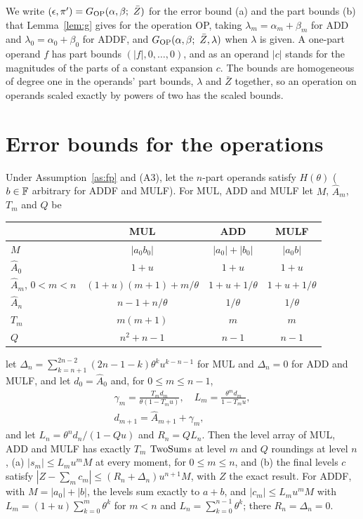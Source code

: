 We write $(\epsilon, \pi') = G_{\rm OP}(\alpha, \beta;\ \bar Z)$ for the error bound (a) and the part bounds (b) that
Lemma~\ref{lem:g} gives for the operation OP, taking $\lambda_m = \alpha_m + \beta_m$ for ADD and $\lambda_0 = \alpha_0
+ \beta_0$ for ADDF, and $G_{\rm OP}(\alpha, \beta;\ \bar Z, \lambda)$ when $\lambda$ is given. A one-part operand $f$
has part bounds $(|f|, 0, \dots, 0)$, and
as an operand $|c|$ stands for the magnitudes of the parts of a constant expansion $c$. The bounds are homogeneous of
degree one in the operands' part bounds, $\lambda$ and $\bar Z$ together, so an operation on operands scaled exactly by
powers of two has the scaled bounds.

\section{Error bounds for the operations}\label{sec:bounds}

\begin{theorem}\label{thm:t2}
Under Assumption~\ref{as:fp} and (A3), let the $n$-part operands
satisfy $H(\theta)$ ($b \in \mathbb{F}$ arbitrary for ADDF and MULF). For MUL, ADD and MULF let $M$, $\hat A_m$, $T_m$ and $Q$ be
\begin{center}
\setlength{\tabcolsep}{5pt}
{\footnotesize\setlength{\tabcolsep}{2.5pt}\begin{tabular}{lccc}
\toprule
& MUL & ADD & MULF \\
\midrule
$M$ & $|a_0 b_0|$ & $|a_0| + |b_0|$ & $|a_0 b|$ \\
$\hat A_0$ & $1+u$ & $1+u$ & $1+u$ \\
$\hat A_m$, $0 < m < n$ & $(1+u)(m+1) + m/\theta$ & $1 + u + 1/\theta$ & $1 + u + 1/\theta$ \\
$\hat A_n$ & $n-1 + n/\theta$ & $1/\theta$ & $1/\theta$ \\
$T_m$ & $m(m+1)$ & $m$ & $m$ \\
$Q$ & $n^2 + n - 1$ & $n-1$ & $n-1$ \\
\bottomrule
\end{tabular}}
\end{center}
let $\Delta_n = \sum_{k=n+1}^{2n-2}(2n-1-k)\theta^k u^{k-n-1}$ for MUL and $\Delta_n = 0$ for ADD and MULF,
and let $d_0 = \hat A_0$ and, for $0 \le m \le n-1$,
\begin{gather*}
\gamma_m = \frac{T_m d_m}{\theta(1 - T_m u)}, \quad L_m = \frac{\theta^m d_m}{1 - T_m u}, \\
d_{m+1} = \hat A_{m+1} + \gamma_m,
\end{gather*}
and let $L_n = \theta^n d_n/(1 - Qu)$ and $R_n = QL_n$.
Then the level array of MUL, ADD and MULF has exactly $T_m$ $\mathrm{TwoSum}$s at level $m$ and $Q$ roundings at level $n$,
(a) $|s_m| \le L_m u^m M$ at every moment, for $0 \le m \le n$, and (b) the final levels $c$ satisfy $|Z - \sum_m c_m|
\le (R_n + \Delta_n)u^{n+1}M$, with $Z$ the exact result. For ADDF, with $M = |a_0| + |b|$, the levels sum exactly to
$a + b$, and $|c_m| \le L_m u^m M$ with $L_m = (1+u)\sum_{k=0}^{m}\theta^k$ for $m < n$ and $L_n =
\sum_{k=0}^{n-1}\theta^k$; there $R_n = \Delta_n = 0$.
\end{theorem}

